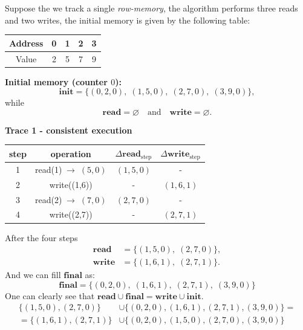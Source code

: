 \documentclass[../lecture-notes-148x210.tex]{subfiles}
\begin{document}
\begin{example}
\noindent Suppose the we track a single \emph{row-memory}, the algorithm performs three reads and two writes, 
the initial memory is given by the following table:
\begin{center}
    \centering
    \begin{tabular}{|c|c|c|c|c|}
        \hline
        Address & 0 & 1 & 2 & 3 \\ \hline
        Value   & 2 & 5 & 7 & 9 \\ \hline
    \end{tabular}
\end{center}

\medskip
\noindent\textbf{Initial memory (counter $0$):}
\begin{equation*}
\mathbf{init} =\{(0,2,0), \; (1,5,0), \; (2,7,0), \; (3,9,0)\},
\end{equation*}
while 
\begin{equation*}
    \mathbf{read} = \varnothing \quad \text{and} \quad \mathbf{write} = \varnothing.
\end{equation*}

\medskip
\noindent\textbf{Trace 1 - consistent execution}
\begin{center}
    \begin{tabular}{c|c|c|c}
    \textbf{step} & \textbf{operation} & $\Delta\mathbf{read}_{\text{step}}$ & $\Delta\mathbf{write}_{\text{step}}$\\\hline
    1 & read(1)$  \; \to \; (5, 0)$ & $(1,5,0)$ & -        \\
    2 & write((1,6))                & -         & $(1,6,1)$\\
    3 & read(2)$  \; \to \; (7, 0)$ & $(2,7,0)$ & -        \\
    4 & write((2,7))                & -         & $(2,7,1)$\\
    \end{tabular}
\end{center}
After the four steps
\begin{equation*}
    \begin{aligned}
        \mathbf{read} &= \{(1,5,0), \; (2,7,0)\},\\
        \mathbf{write} &= \{(1,6,1), \; (2,7,1)\}.
    \end{aligned}
\end{equation*}
And we can fill $\mathbf{final}$ as:
\begin{equation*}
    \mathbf{final} = \{(0,2,0), \; (1,6,1), \; (2,7,1), \; (3,9,0)\}
\end{equation*}
One can clearly see that $\mathbf{read} \cup \mathbf{final} = \mathbf{write} \cup \mathbf{init}$.
\begin{align*}
    \{(1,5,0), (2,7,0)\} &\cup \{(0,2,0), (1,6,1), (2,7,1), (3,9,0)\} = \\
    = \{(1,6,1), (2,7,1)\} &\cup \{(0,2,0), (1,5,0), (2,7,0), (3,9,0)\}
\end{align*}


\end{example}
\end{document}
